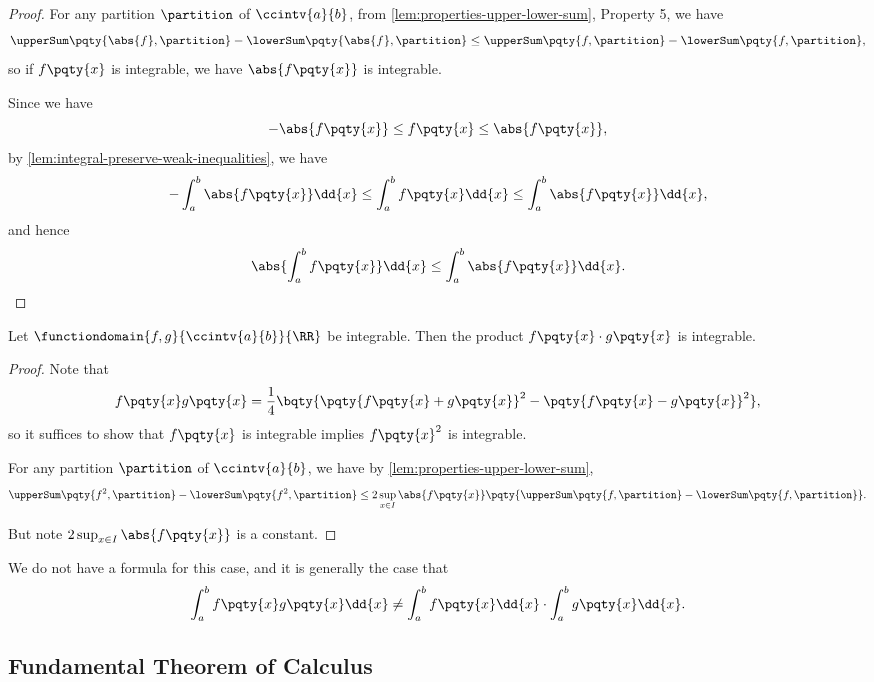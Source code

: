 \begin{proof}
    For any partition \(\partition\) of \(\ccintv{a}{b}\), from \autoref{lem:properties-upper-lower-sum}, Property 5, we have
    \[
        \upperSum\pqty{\abs{f}, \partition} - \lowerSum\pqty{\abs{f}, \partition} \leq \upperSum\pqty{f, \partition} - \lowerSum\pqty{f, \partition},
    \]
    so if \(f \pqty{x}\) is integrable, we have \(\abs{f \pqty{x}}\) is integrable.

    Since we have
    \[
        - \abs{f \pqty{x}} \leq f\pqty{x} \leq \abs{f\pqty{x}},
    \]
    by \autoref{lem:integral-preserve-weak-inequalities}, we have
    \[
        -\int_{a}^{b} \abs{f\pqty{x}} \dd{x} \leq \int_{a}^{b} f\pqty{x} \dd{x} \leq \int_{a}^{b} \abs{f\pqty{x}} \dd{x},
    \]
    and hence
    \[
        \abs{\int_{a}^{b} f\pqty{x}} \dd{x} \leq \int_{a}^{b} \abs{f\pqty{x}} \dd{x}.
    \]
\end{proof}

\begin{lemma}
    \label{lem:integral-product}%
    Let \(\functiondomain{f, g}{\ccintv{a}{b}}{\RR}\) be integrable. Then the product \(f\pqty{x} \cdot g\pqty{x}\) is integrable.
\end{lemma}

\begin{proof}
    Note that
    \[
        f\pqty{x} g\pqty{x} = \frac{1}{4} \bqty{\pqty{f\pqty{x} + g\pqty{x}}^2 - \pqty{f\pqty{x} - g\pqty{x}}^2},
    \]
    so it suffices to show that \(f\pqty{x}\) is integrable implies \(f\pqty{x}^2\) is integrable.

    For any partition \(\partition\) of \(\ccintv{a}{b}\), we have by \autoref{lem:properties-upper-lower-sum},
    \[
        \upperSum\pqty{f^2, \partition} - \lowerSum\pqty{f^2, \partition} \leq 2 \sup_{x \in I} \abs{f\pqty{x}} \pqty{\upperSum\pqty{f, \partition} - \lowerSum\pqty{f, \partition}}.
    \]

    But note \(2 \sup_{x \in I} \abs{f\pqty{x}}\) is a constant.
\end{proof}

\begin{remark}
    We do not have a formula for this case, and it is generally the case that
    \[
        \int_{a}^{b} f\pqty{x} g\pqty{x} \dd{x} \neq \int_{a}^{b} f\pqty{x} \dd{x} \cdot \int_{a}^{b} g\pqty{x} \dd{x}.
    \]
\end{remark}

\subsection{Fundamental Theorem of Calculus}

